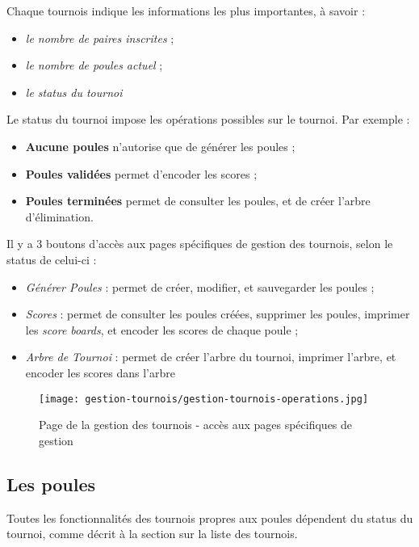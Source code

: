 Chaque tournois indique les informations les plus importantes, à savoir :

\begin{itemize}
\item \textit{le nombre de paires inscrites} ;
\item \textit{le nombre de poules actuel} ;
\item \textit{le status du tournoi}
\end{itemize}
\bigskip

Le status du tournoi impose les opérations possibles sur le tournoi. Par exemple :

\begin{itemize}
\item  \textbf{Aucune poules} n'autorise que de générer les poules ;
\item \textbf{Poules validées} permet d'encoder les scores ;
\item \textbf{Poules terminées} permet de consulter les poules, et de créer l'arbre d'élimination.
\end{itemize}
\bigskip

Il y a 3 boutons d'accès aux pages spécifiques de gestion des tournois, selon le status de celui-ci :

\begin{itemize}
\item \textit{Générer Poules} : permet de créer, modifier, et sauvegarder les poules ;
\item \textit{Scores} : permet de consulter les poules créées, supprimer les poules, imprimer les \textit{score boards}, et encoder les scores de chaque poule ;
\item \textit{Arbre de Tournoi} : permet de créer l'arbre du tournoi, imprimer l'arbre, et encoder les scores dans l'arbre
\end{itemize}

\begin{figure}[H]
\centering
\texttt{[image: gestion-tournois/gestion-tournois-operations.jpg]}
\caption{Page de la gestion des tournois - accès aux pages spécifiques de gestion}
\end{figure}

\subsection{Les poules}

Toutes les fonctionnalités des tournois propres aux poules dépendent du status du tournoi, comme décrit à la section sur la liste des tournois.
\bigskip

